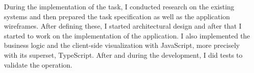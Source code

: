 During the implementation of the task, I conducted research on the existing systems and then prepared the task specification as well as the application wireframes. After defining these, I started architectural design and after that I started to work on the implementation of the application. I also implemented the business logic and the client-side visualization with JavaScript, more precisely with its superset, TypeScript. After and during the development, I did tests to validate the operation.

\vfill
\selectthesislanguage

\setcounter{romanPage}{\value{page}}
